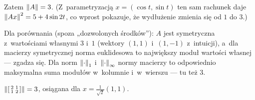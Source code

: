 \documentclass[11pt]{article}
\begin{document}
Zatem $\left\lVert A \right\rVert=3$. (Z~parametryzacją $x=(\cos t,\sin t)$ ten sam rachunek
daje $\left\lVert Ax \right\rVert^2=5+4\sin2t$, co wprost pokazuje, że wydłużenie zmienia się
od $1$ do $3$.)

\begin{uwaga}
Dla porównania (spoza „dozwolonych środków”): $A$ jest symetryczna z~wartościami
własnymi $3$ i~$1$ (wektory $(1,1)$ i~$(1,-1)$ z~intuicji), a~dla macierzy
symetrycznej norma euklidesowa to największy moduł wartości własnej
--- zgadza się. Dla norm $\left\lVert \cdot \right\rVert_1$ i~$\left\lVert \cdot \right\rVert_\infty$ normy macierzy to
odpowiednio maksymalna suma modułów w~kolumnie i~w~wierszu --- tu też $3$.
\end{uwaga}

\begin{odpowiedz}
$\left\lVert \left[\begin{smallmatrix}2&1\\1&2\end{smallmatrix}\right] \right\rVert=3$,
osiągana dla $x=\frac1{\sqrt2}(1,1)$.
\end{odpowiedz}
\end{document}
